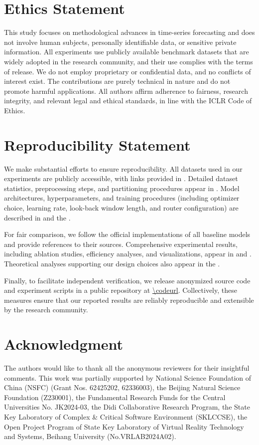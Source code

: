 \section{Ethics Statement}

This study focuses on methodological advances in time-series forecasting and does not involve human subjects, personally identifiable data, or sensitive private information.
All experiments use publicly available benchmark datasets that are widely adopted in the research community, and their use complies with the terms of release.
We do not employ proprietary or confidential data, and no conflicts of interest exist.
The contributions are purely technical in nature and do not promote harmful applications.
All authors affirm adherence to fairness, research integrity, and relevant legal and ethical standards, in line with the ICLR Code of Ethics.


\section{Reproducibility Statement}

We make substantial efforts to ensure reproducibility. 
All datasets used in our experiments are publicly accessible, with links provided in . 
Detailed dataset statistics, preprocessing steps, and partitioning procedures appear in . 
Model architectures, hyperparameters, and training procedures (including optimizer choice, learning rate, look-back window length, and router configuration) are described in  and the .

For fair comparison, we follow the official implementations of all baseline models and provide references to their sources. Comprehensive experimental results, including ablation studies, efficiency analyses, and visualizations, appear in  and . Theoretical analyses supporting our design choices also appear in the .

Finally, to facilitate independent verification, we release anonymized source code and experiment scripts in a public repository at \url{\codeurl}. 
Collectively, these measures ensure that our reported results are reliably reproducible and extensible by the research community.

\section{Acknowledgment}

The authors would like to thank all the anonymous reviewers for their insightful comments.
This work was partially supported by National Science Foundation of China (NSFC) (Grant Nos. 62425202, 62336003), the Beijing Natural Science Foundation (Z230001), the Fundamental Research Funds for the Central Universities No. JK2024-03, the Didi Collaborative Research Program, the State Key Laboratory of Complex \& Critical Software Environment (SKLCCSE), the Open Project Program of State Key Laboratory of Virtual Reality Technology and Systems, Beihang University (No.VRLAB2024A02).